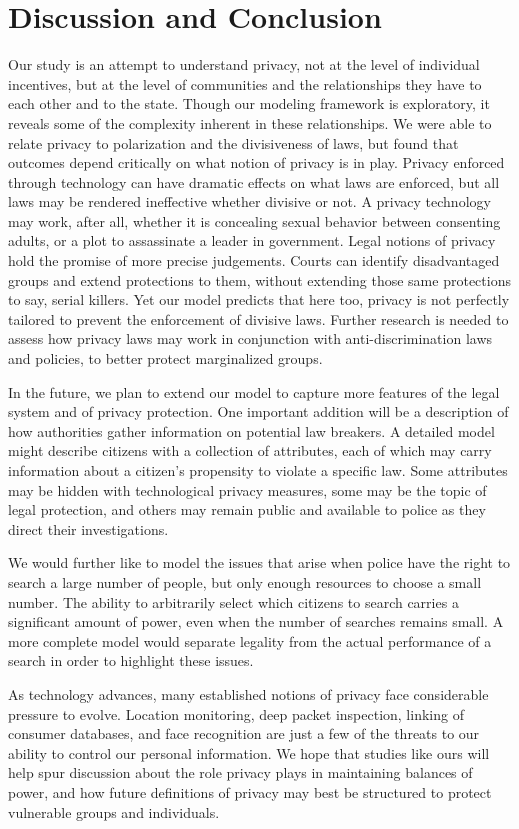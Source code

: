 
\section{Discussion and Conclusion}
\label{sec:concl}

Our study is an attempt to understand privacy, not at the level of individual incentives, but at the level of communities and the relationships they have to each other and to the state.  Though our modeling framework is exploratory, it reveals some of the complexity inherent in these relationships.  We were able to relate privacy to polarization and the divisiveness of laws, but found that outcomes depend critically on what notion of privacy is in play.  Privacy enforced through technology can have dramatic effects on what laws are enforced, but all laws may be rendered ineffective whether divisive or not.  A privacy technology may work, after all, whether it is concealing sexual behavior between consenting adults, or a plot to assassinate a leader in government.  Legal notions of privacy hold the promise of more precise judgements.  Courts can identify disadvantaged groups and extend protections to them, without extending those same protections to say, serial killers.  Yet our model predicts that here too, privacy is not perfectly tailored to prevent the enforcement of divisive laws.  Further research is needed to assess how privacy laws may work in conjunction with anti-discrimination laws and policies, to better protect marginalized groups. 

In the future, we plan to extend our model to capture more features of the legal system and of privacy protection.  One important addition will be a description of how authorities gather information on potential law breakers.  A detailed model might describe citizens with a collection of attributes, each of which may carry information about a citizen's propensity to violate a specific law.  Some attributes may be hidden with technological privacy measures, some may be the topic of legal protection, and others may remain public and available to police as they direct their investigations.  

We would further like to model the issues that arise when police have the right to search a large number of people, but only enough resources to choose a small number.  The ability to arbitrarily select which citizens to search carries a significant amount of power, even when the number of searches remains small.  A more complete model would separate legality from the actual performance of a search in order to highlight these issues.

As technology advances, many established notions of privacy face considerable pressure to evolve.  Location monitoring, deep packet inspection, linking of consumer databases, and face recognition are just a few of the threats to our ability to control our personal information.  We hope that studies like ours will help spur discussion about the role privacy plays in maintaining balances of power, and how future definitions of privacy may best be structured to protect vulnerable groups and individuals.


